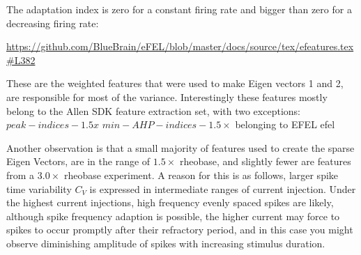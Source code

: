 The adaptation index is zero for a constant firing rate and bigger than zero for a decreasing firing rate:
  




\url{https://github.com/BlueBrain/eFEL/blob/master/docs/source/tex/efeatures.tex#L382}

These are the weighted features that were used to make Eigen vectors 1 and 2, are responsible for most of the variance. Interestingly these features mostly belong to the Allen SDK feature extraction set, with two exceptions: $peak-indices-1.5x$ $min-AHP-indices-1.5 \times$ belonging to EFEL efel 

Another observation is that a small majority of features used to create the sparse Eigen Vectors, are in the range of $1.5 \times$  rheobase, and slightly fewer are features from a $3.0\times$ rheobase experiment. A reason for this is as follows, larger spike time variability $C_{V}$ is expressed in intermediate ranges of current injection. Under the highest current injections, high frequency evenly spaced spikes are likely, although spike frequency adaption is possible, the higher current may force to spikes to occur promptly after their refractory period, and in this case you might observe diminishing amplitude of spikes with increasing stimulus duration.

